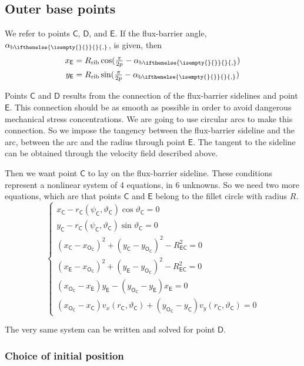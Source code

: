 \documentclass[b5paper,11pt,oneside,fleqn]{article}
\newcommand{\ped}[1]{_\textup{#1}}
\newcommand{\pt}[1]{\mathsf{#1}}
\newcommand{\te}{\vartheta}
\newcommand{\ab}[1][]{%
\alpha_{\textup{b}
\ifthenelse{\isempty{#1}{}}{}{,#1}%
}}
\newcommand{\pih}[1][]{\tfrac{\pi}{2#1}}
\begin{document}
\subsection{Outer base points}
We refer to points $ \pt{C} $, $ \pt{D} $, and $ \pt{E} $.
If the flux-barrier angle, $ \ab $, is given, then
\begin{equation}
\begin{aligned}
x_\pt{E} &= R\ped{rib} \cos(\pih[p] - \ab) \\
y_\pt{E} &= R\ped{rib} \sin(\pih[p] - \ab)
\end{aligned}
\end{equation}

Points $ \pt{C} $ and $ \pt{D} $ results from the connection of the
flux-barrier sidelines and point $ \pt{E} $.
This connection should be as smooth as possible in order to
avoid dangerous mechanical stress concentrations.
We are going to use circular arcs to make this connection.
So we impose the tangency between the flux-barrier sideline and the arc,
between the arc and the radius through point $ \pt{E} $.
The tangent to the sideline can be obtained through the velocity field
described above.

Then we want point $ \pt{C} $ to lay on the flux-barrier sideline. These
conditions represent a nonlinear system of 4 equations, in 6 unknowns.
So we need two more equations, which are that points $ \pt{C} $ and $ \pt{E} $
belong to the fillet circle with radius $ R $.
\begin{equation}
\begin{cases}
x_\pt{C} - r_\pt{C}(\psi_\pt{C}, \te_\pt{C}) \cos\te_\pt{C} = 0 \\
y_\pt{C} - r_\pt{C}(\psi_\pt{C}, \te_\pt{C}) \sin\te_\pt{C} = 0 \\
%
(x_\pt{C} - x_\pt{O_\pt{C}})^2 + (y_\pt{C} - y_\pt{O_\pt{C}})^2
- R_\pt{EC}^2 = 0 \\
(x_\pt{E} - x_\pt{O_\pt{C}})^2 + (y_\pt{E} - y_\pt{O_\pt{C}})^2
- R_\pt{EC}^2 = 0 \\
%
(x_\pt{O_\pt{C}} - x_\pt{E}) y_\pt{E} -
(y_\pt{O_\pt{C}} - y_\pt{E}) x_\pt{E} = 0 \\
%
(x_\pt{O_\pt{C}} - x_\pt{C}) v_x(r_\pt{C},\te_\pt{C}) +
(y_\pt{O_\pt{C}} - y_\pt{C}) v_y(r_\pt{C},\te_\pt{C}) = 0
\end{cases}
\end{equation}

The very same system can be written and solved for point $ \pt{D} $.


\subsubsection{Choice of initial position}
\end{document}
